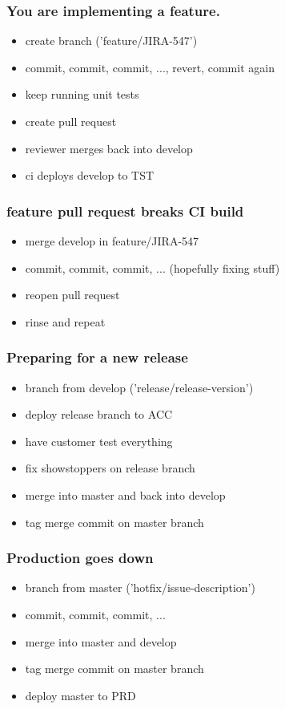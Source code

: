 \begin{frame}
	\frametitle{You are implementing a feature.}

	\begin{block}{}
	\begin{itemize}
		\item create branch ('feature/JIRA-547')
		\item commit, commit, commit, ..., revert, commit again
		\item keep running unit tests
		\item create pull request
		\item reviewer merges back into develop
		\item ci deploys develop to TST
	\end{itemize}
	\end{block}
\end{frame}

\begin{frame}
	\frametitle{feature pull request breaks CI build}

	\begin{block}{}
	\begin{itemize}
		\item merge develop in feature/JIRA-547
		\item commit, commit, commit, ... (hopefully fixing stuff)
		\item reopen pull request
		\item rinse and repeat
	\end{itemize}
	\end{block}
\end{frame}

\begin{frame}
	\frametitle{Preparing for a new release}
	\begin{block}{}
	\begin{itemize}
		\item branch from develop ('release/release-version')
		\item deploy release branch to ACC
		\item have customer test everything
		\item fix showstoppers on release branch
		\item merge into master and back into develop
		\item tag merge commit on master branch
	\end{itemize}
	\end{block}
\end{frame}

\begin{frame}
	\frametitle{Production goes down}
	\begin{block}{}
	\begin{itemize}
		\item branch from master ('hotfix/issue-description')
		\item commit, commit, commit, ...
		\item merge into master and develop
		\item tag merge commit on master branch
		\item deploy master to PRD
	\end{itemize}
	\end{block}
\end{frame}
